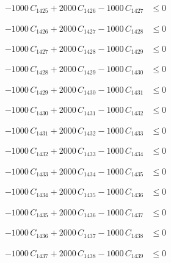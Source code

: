 \documentclass[a4paper,11pt]{article}
\begin{document}
\begin{align}
-1000\,C_{1425} + 2000\,C_{1426} - 1000\,C_{1427} &\leq 0 \nonumber
\end{align}

\begin{align}
-1000\,C_{1426} + 2000\,C_{1427} - 1000\,C_{1428} &\leq 0 \nonumber
\end{align}

\begin{align}
-1000\,C_{1427} + 2000\,C_{1428} - 1000\,C_{1429} &\leq 0 \nonumber
\end{align}

\begin{align}
-1000\,C_{1428} + 2000\,C_{1429} - 1000\,C_{1430} &\leq 0 \nonumber
\end{align}

\begin{align}
-1000\,C_{1429} + 2000\,C_{1430} - 1000\,C_{1431} &\leq 0 \nonumber
\end{align}

\begin{align}
-1000\,C_{1430} + 2000\,C_{1431} - 1000\,C_{1432} &\leq 0 \nonumber
\end{align}

\begin{align}
-1000\,C_{1431} + 2000\,C_{1432} - 1000\,C_{1433} &\leq 0 \nonumber
\end{align}

\begin{align}
-1000\,C_{1432} + 2000\,C_{1433} - 1000\,C_{1434} &\leq 0 \nonumber
\end{align}

\begin{align}
-1000\,C_{1433} + 2000\,C_{1434} - 1000\,C_{1435} &\leq 0 \nonumber
\end{align}

\begin{align}
-1000\,C_{1434} + 2000\,C_{1435} - 1000\,C_{1436} &\leq 0 \nonumber
\end{align}

\begin{align}
-1000\,C_{1435} + 2000\,C_{1436} - 1000\,C_{1437} &\leq 0 \nonumber
\end{align}

\begin{align}
-1000\,C_{1436} + 2000\,C_{1437} - 1000\,C_{1438} &\leq 0 \nonumber
\end{align}

\begin{align}
-1000\,C_{1437} + 2000\,C_{1438} - 1000\,C_{1439} &\leq 0 \nonumber
\end{align}
\end{document}
